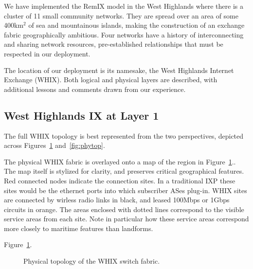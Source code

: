 
We have implemented the RemIX model in the West Highlands where there
is a cluster of
11 small community networks. They are spread over an area of some 400km$^2$
 of sea and mountainous islands, making the
construction of an exchange fabric geographically ambitious. Four networks have
a history of interconnecting and sharing network resources, pre-established
relationships that must be respected in our deployment.

The location of our deployment is its namesake, the West Highlands Internet
Exchange (WHIX). Both logical and physical layers are described, with
additional lessons and comments drawn from our experience.



\subsection{West Highlands IX at Layer 1}

The full WHIX topology is best represented from the two perspectives, depicted
across Figures~\ref{fig:whixmap} and~\ref{fig:phytop}.

The physical WHIX fabric is overlayed onto a map of the region in
Figure~\ref{fig:whixmap}.. The map itself is stylized for clarity, and preserves
critical geographical features. Red connected nodes indicate the connection
sites. In a traditional IXP these sites would be the ethernet ports into which
subscriber ASes plug-in. WHIX sites are connected by wirless radio links in
black, and leased 100Mbps or 1Gbps circuits in orange. The areas enclosed with
dotted lines correspond to the visible service areas from each site.
 Note in particular how these service areas
correspond more  closely to maritime features than landforms.

Figure~\ref{fig:whixmap}.
\begin{figure}[h]
  \resizebox{\linewidth}{!}{
    \begin{tikzpicture}
      \whixphysicaldiagram
    \end{tikzpicture}
  }
  \caption{Physical topology of the \acf{WHIX} switch fabric.}
  \label{fig:whixmap}
\end{figure}

